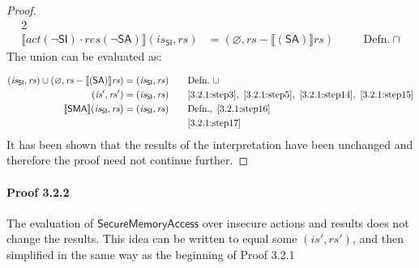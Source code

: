 \documentclass[12pt, letterpaper]{article}
\let\emptyset\varnothing
\newcommand\interp[1]{\llbracket #1 \rrbracket}
\begin{document}
\begin{proof}
{\begin{alignat}{2}
     \\
     \label{3.2.1:step14}
     \interp{ \mathit{act}(\neg\mathsf{SI}) \cdot
      \mathit{res}(\neg\mathsf{SA}) } (\mathit{is_{\mathsf{SI}}}, \mathit{rs})
     &=
     (\emptyset, \mathit{rs} - \interp{ (\mathsf{SA}) } \mathit{rs})
     &&\quad \text{Defn.}\ \cap
 \end{alignat}
 }%
     The union can be evaluated as:
 \par\nobreak
 {\fontsize{10pt}{12pt}\selectfont
 \begin{alignat}{2}
     \label{3.2.1:step15}
     (\mathit{is_{\mathsf{SI}}}, \mathit{rs}) \cup 
     (\emptyset, \mathit{rs} - \interp{ (\mathsf{SA}) } \mathit{rs})
     &=
     (\mathit{is_{\mathsf{SI}}}, \mathit{rs})
     &&\quad \text{Defn.}\ \cup
     \\
     \label{3.2.1:step16}
     (\mathit{is}', \mathit{rs}')
     &=
     (\mathit{is_{\mathsf{SI}}}, \mathit{rs})
     &&\quad \ref{3.2.1:step3},\ \ref{3.2.1:step5},\ \ref{3.2.1:step14},\ \ref{3.2.1:step15}
     \\
     \label{3.2.1:step17}
     \interp{ \mathsf{SMA} } (\mathit{is_{\mathsf{SI}}}, \mathit{rs})
     &=
     (\mathit{is_{\mathsf{SI}}}, \mathit{rs})
     &&\quad \text{Defn.},\ \ref{3.2.1:step16}
     \\
     \label{3.2.1:qed}
     &\quad \qedhere
     &&\quad \ref{3.2.1:step17}
 \end{alignat}
 }%
     It has been shown that the results of the interpretation have been unchanged and therefore the proof need not continue further.
 \end{proof}

 \paragraph{Proof 3.2.2}
     The evaluation of $\mathsf{SecureMemoryAccess}$ over insecure actions and results does not change the results.  This idea can be written to equal some $(\mathit{is}', \mathit{rs}')$, and then simplified in the same way as the beginning of Proof 3.2.1
\end{document}
